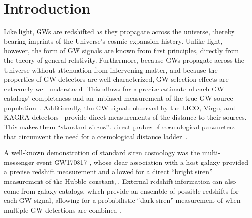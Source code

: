 \documentclass[preprint2,linenumbers]{aastex631}
\begin{document}
\section{Introduction}
\label{sec:intro}
Like light, \acp{GW} are redshifted as they propagate across the universe, thereby bearing imprints of the Universe's cosmic expansion history.
Unlike light, however, the form of \ac{GW} signals are known from first principles, directly from the theory of general relativity. Furthermore, because \acp{GW} propagate across the Universe without attenuation from intervening matter, and because the properties of \ac{GW} detectors are well characterized, \ac{GW} selection effects are extremely well understood. %
This allows for a precise estimate of each \ac{GW} catalogs' completeness and an unbiased measurement of the true \ac{GW} source population~\citep{2023PhRvX..13d1039A,abbott_population_2023,2023PhRvD.108d3011E}. 
Additionally, the \ac{GW} signals observed by the LIGO, Virgo, and KAGRA detectors~\citep{aasi_advanced_2015,acernese_advanced_2014,akutsu_overview_2021}  provide direct measurements of the distance to their sources.
This makes them ``standard sirens'': direct probes of cosmological parameters that circumvent the need for a cosmological distance ladder~\citep{schutz_determining_1986,holz_using_2005}. 

A well-known demonstration of standard siren cosmology was the multi-messenger event GW170817 \citep{abbott_multi-messenger_2017,coulter_swope_2017,valenti_discovery_2017,2017ApJ...848L..27T}, whose clear association with a host galaxy provided a precise redshift measurement and allowed for a direct ``bright siren'' measurement of the Hubble constant, \Ho{} \citep{abbott_gravitational-wave_2017}.
External redshift information can also come from galaxy catalogs, which provide an ensemble of possible redshifts for each \ac{GW} signal, allowing for a probabilistic ``dark siren'' measurement of \Ho{} when multiple \ac{GW} detections are combined \citep{del_pozzo_inference_2012, chen_two_2018, fishbach_standard_2019, soares-santos_first_2019,gray_cosmological_2020, abbott_gravitational-wave_2021, gwtc3_cosmo, gray_pixelated_2022,gray_joint_2023,mastrogiovanni_joint_2023, gair_hitchhikers_2023}.
\end{document}
